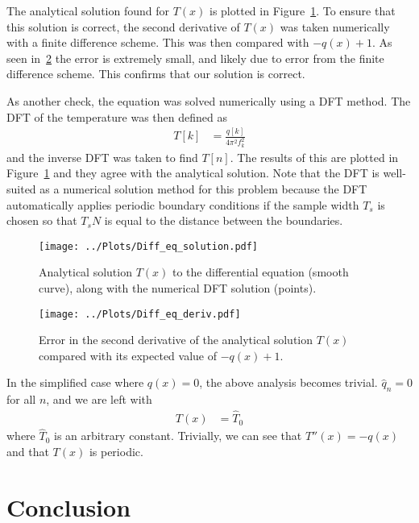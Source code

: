 \documentclass[twocolumn]{myarticle}
\begin{document}
The analytical solution found for $ T(x) $ is plotted in Figure~\ref{fig:diff_eq_solution}.
To ensure that this solution is correct, the second derivative of $ T(x) $ was taken numerically with a finite difference scheme.
This was then compared with $ -q(x)+1 $.
As seen in~\ref{fig:diff_eq_deriv} the error is extremely small, and likely due to error from the finite difference scheme.
This confirms that our solution is correct.

As another check, the equation was solved numerically using a DFT method.
The DFT of the temperature was then defined as
\begin{align}
    T[k] &= \frac{q[k]}{4 \pi^2 f_k^2}
\end{align}
and the inverse DFT was taken to find $ T[n] $.
The results of this are plotted in Figure~\ref{fig:diff_eq_solution} and they agree with the analytical solution.
Note that the DFT is well-suited as a numerical solution method for this problem because the DFT automatically applies periodic boundary conditions if the sample width $ T_s $ is chosen so that $ T_s N $ is equal to the distance between the boundaries.

\begin{figure}[ht]
    \centering
    \texttt{[image: ../Plots/Diff\_eq\_solution.pdf]}
    \caption{Analytical solution $ T(x) $ to the differential equation (smooth curve), along with the numerical DFT solution (points).}
    \label{fig:diff_eq_solution}
\end{figure}

\begin{figure}[ht]
    \centering
    \texttt{[image: ../Plots/Diff\_eq\_deriv.pdf]}
    \caption{Error in the second derivative of the analytical solution $ T(x) $ compared with its expected value of $ -q(x) + 1 $.}
    \label{fig:diff_eq_deriv}
\end{figure}

In the simplified case where $ q(x) = 0 $, the above analysis becomes trivial.
$ \hat{q}_n = 0 $ for all $ n $, and we are left with
\begin{align}
    T(x) &= \hat{T}_0
\end{align}
where $ \hat{T}_0 $ is an arbitrary constant.
Trivially, we can see that $ T''(x) = -q(x) $ and that $ T(x) $ is periodic.

\section{Conclusion}
\label{sec:conclusion}
\end{document}
